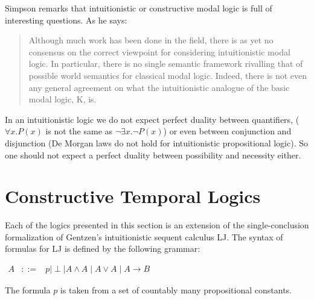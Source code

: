 \documentclass{article}
\begin{document}
 Simpson remarks that intuitionistic or constructive modal logic is
 full of interesting questions. As he says:
\begin{quote}
Although much work has been done in the field, there is as yet no
consensus on the correct viewpoint for considering intuitionistic
modal logic.  In particular, there is no single semantic framework
rivalling that of possible world semantics for classical modal logic.
Indeed, there is not even any general agreement on what the
intuitionistic analogue of the basic modal logic, K, is.
\end{quote}
In an intuitionistic logic we do not expect perfect duality between
quantifiers, ($\forall x.P(x)$ is not the same as $\neg \exists x.\neg
P(x)$) or even between conjunction and disjunction (De Morgan laws do
not hold for intuitionistic propositional logic). So one should not
expect a perfect duality between possibility and necessity either.

\section{Constructive Temporal Logics}

Each of the logics presented in this section is an extension of the
single-conclusion formalization of Gentzen's intuitionistic sequent
calculus LJ.  The syntax of formulas for LJ is defined by the
following grammar:
\begin{center}
    \begin{math}
        \begin{array}{lllllllll}
            A & ::= & p \mid \perp \mid A \land A \mid A \lor A \mid A \to B
        \end{array}
    \end{math}
\end{center}
The formula $p$ is taken from a set of countably many propositional
constants.
\end{document}
